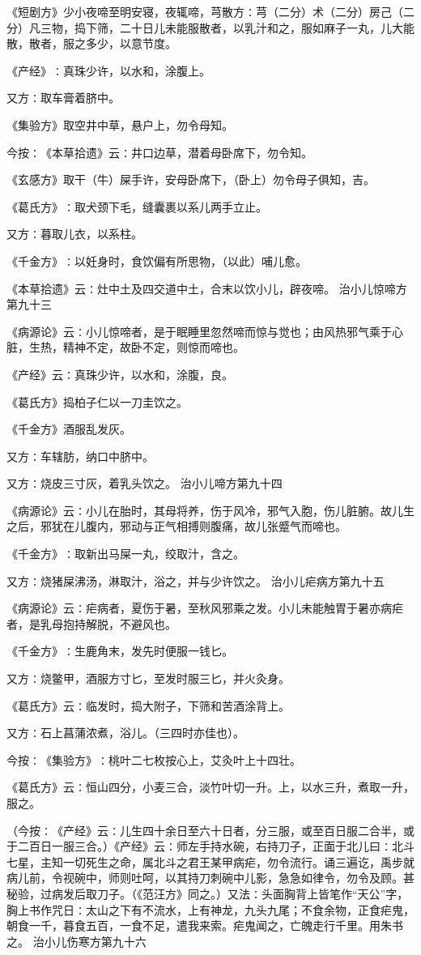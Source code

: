 \documentclass[a4paper,12pt,UTF8,twoside]{ctexbook}
\begin{document}
《短剧方》少小夜啼至明安寝，夜辄啼，芎散方∶芎（二分）术（二分）房己（二分）凡三物，捣下筛，二十日儿未能服散者，以乳汁和之，服如麻子一丸，儿大能散，散者，服之多少，以意节度。

《产经》∶真珠少许，以水和，涂腹上。

又方∶取车膏着脐中。

《集验方》取空井中草，悬户上，勿令母知。

今按∶《本草拾遗》云∶井口边草，潜着母卧席下，勿令知。

《玄感方》取干（牛）屎手许，安母卧席下，（卧上）勿令母子俱知，吉。

《葛氏方》∶取犬颈下毛，缝囊裹以系儿两手立止。

又方∶暮取儿衣，以系柱。

《千金方》∶以妊身时，食饮偏有所思物，（以此）哺儿愈。

《本草拾遗》云∶灶中土及四交道中土，合末以饮小儿，辟夜啼。
治小儿惊啼方第九十三

《病源论》云∶小儿惊啼者，是于眠睡里忽然啼而惊与觉也；由风热邪气乘于心脏，生热，精神不定，故卧不定，则惊而啼也。

《产经》云∶真珠少许，以水和，涂腹，良。

《葛氏方》捣柏子仁以一刀圭饮之。

《千金方》酒服乱发灰。

又方∶车辖肪，纳口中脐中。

又方∶烧皮三寸灰，着乳头饮之。
治小儿啼方第九十四

《病源论》云∶小儿在胎时，其母将养，伤于风冷，邪气入胞，伤儿脏腑。故儿生之后，邪犹在儿腹内，邪动与正气相搏则腹痛，故儿张蹙气而啼也。

《千金方》∶取新出马屎一丸，绞取汁，含之。

又方∶烧猪屎沸汤，淋取汁，浴之，并与少许饮之。
治小儿疟病方第九十五

《病源论》云∶疟病者，夏伤于暑，至秋风邪乘之发。小儿未能触胃于暑亦病疟者，是乳母抱持解脱，不避风也。

《千金方》∶生鹿角末，发先时便服一钱匕。

又方∶烧鳖甲，酒服方寸匕，至发时服三匕，并火灸身。

《葛氏方》云∶临发时，捣大附子，下筛和苦酒涂背上。

又方∶石上菖蒲浓煮，浴儿。（三四时亦佳也）。

今按∶《集验方》∶桃叶二七枚按心上，艾灸叶上十四壮。

《葛氏方》云∶恒山四分，小麦三合，淡竹叶切一升。上，以水三升，煮取一升，服之。

（今按∶《产经》云∶儿生四十余日至六十日者，分三服，或至百日服二合半，或于二百日一服三合。）《产经》云∶师左手持水碗，右持刀子，正面于北儿曰∶北斗七星，主知一切死生之命，属北斗之君王某甲病疟，勿令流行。诵三遍讫，禹步就病儿前，令视碗中，师则吐呵，以其持刀刺碗中儿影，急急如律令，勿令及顾。甚秘验，过病发后取刀子。（《范汪方》同之。）又法∶头面胸背上皆笔作“天公”字，胸上书作咒日∶太山之下有不流水，上有神龙，九头九尾；不食余物，正食疟鬼，朝食一千，暮食五百，一食不足，遣我来索。疟鬼闻之，亡魄走行千里。用朱书之。
治小儿伤寒方第九十六
\end{document}
